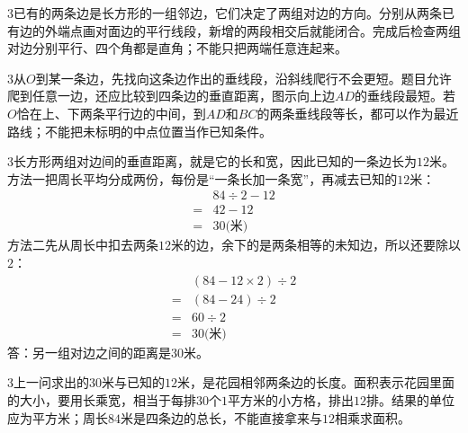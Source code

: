 \documentclass[multi=snippet,border={5bp 20bp 5bp 5bp}]{standalone}
\newenvironment{snippet}[3]{\begin{minipage}{#1bp}\color{answerred}\fontsize{#2}{#3}\selectfont\raggedright}{\end{minipage}}
\begin{document}
\begin{snippet}{505}{11.5}{14}\begin{multicols}{3}\raggedcolumns 已有的两条边是长方形的一组邻边，它们决定了两组对边的方向。分别从两条已有边的外端点画对面边的平行线段，新增的两段相交后就能闭合。完成后检查两组对边分别平行、四个角都是直角；不能只把两端任意连起来。\end{multicols}\end{snippet}
\begin{snippet}{505}{11.5}{14}\begin{multicols}{3}\raggedcolumns 从\(O\)\allowbreak 到某一条边，先找向这条边作出的垂线段，沿斜线爬行不会更短。题目允许爬到任意一边，还应比较到四条边的垂直距离，图示向上边\(AD\)\allowbreak 的垂线段最短。若\(O\)\allowbreak 恰在上、下两条平行边的中间，到\(AD\)\allowbreak 和\(BC\)\allowbreak 的两条垂线段等长，都可以作为最近路线；不能把未标明的中点位置当作已知条件。\end{multicols}\end{snippet}
\begin{snippet}{505}{11.5}{14}\begin{multicols}{3}\raggedcolumns 长方形两组对边间的垂直距离，就是它的长和宽，因此已知的一条边长为\(12\)\allowbreak 米。方法一把周长平均分成两份，每份是“一条长加一条宽”，再减去已知的\(12\)\allowbreak 米：\[\begin{aligned}&84\div2-12\\={}&42-12\\={}&30\text{(米)}\end{aligned}\]方法二先从周长中扣去两条\(12\)\allowbreak 米的边，余下的是两条相等的未知边，所以还要除以\(2\)\allowbreak ：\[\begin{aligned}&(84-12\times2)\div2\\={}&(84-24)\div2\\={}&60\div2\\={}&30\text{(米)}\end{aligned}\]答：另一组对边之间的距离是30米。\end{multicols}\end{snippet}
\begin{snippet}{505}{11.5}{14}\begin{multicols}{3}\raggedcolumns 上一问求出的\(30\)\allowbreak 米与已知的\(12\)\allowbreak 米，是花园相邻两条边的长度。面积表示花园里面的大小，要用长乘宽，相当于每排\(30\)\allowbreak 个\(1\)\allowbreak 平方米的小方格，排出\(12\)\allowbreak 排。结果的单位应为平方米；周长\(84\)\allowbreak 米是四条边的总长，不能直接拿来与\(12\)\allowbreak 相乘求面积。\end{multicols}\end{snippet}
\end{document}
